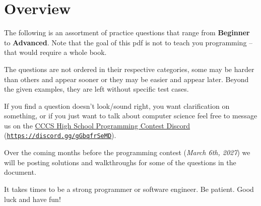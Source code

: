 \section{Overview}

The following is an assortment of practice questions that range from \textbf{Beginner} to \textbf{Advanced}.
Note that the goal of this pdf is not to teach you programming -- that
would require a whole book.

The questions are not ordered in their respective categories, some may be harder than others and appear sooner or they may be easier and appear later. Beyond the given examples, they are left without specific test cases.

If you find a question doesn't look/sound right, you want clarification on something, or if you just want to talk about computer science feel free to message us on the
\href{https://discord.gg/gGbqfrSeMD}{CCCS High School Programming Contest Discord}
(\href{https://discord.gg/gGbqfrSeMD}{\texttt{https://discord.gg/gGbqfrSeMD}}).

Over the coming months before the programming contest (\emph{March 6th, 2027})
we will be posting solutions and walkthroughs for some of the questions in the
document.

It takes times to be a strong programmer or software engineer.
Be patient.
Good luck and have fun!

